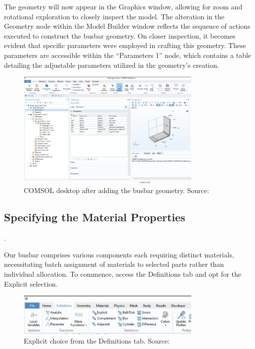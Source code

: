 The geometry will now appear in the Graphics window, allowing for zoom and rotational exploration to closely inspect the model. The alteration in the Geometry node within the Model Builder window reflects the sequence of actions executed to construct the busbar geometry. On closer inspection, it becomes evident that specific parameters were employed in crafting this geometry. These parameters are accessible within the ``Parameters 1'' node, which contains a table detailing the adjustable parameters utilized in the geometry's creation.

\begin{figure}[H]
  \centering
  \includegraphics[width=0.8\textwidth]{Chapters/Figures/Chapter 3 Figures/Initial Busbar Geom.png}
  \caption{COMSOL desktop after adding the busbar geometry. Source: \cite{multiphysics__modeling_nodate}}
  \label{fig:COMSOL desktop after busbar geometry}
\end{figure}

\subsection{Specifying the Material Properties}.

Our busbar comprises various components each requiring distinct materials, necessitating batch assignment of materials to selected parts rather than individual allocation. To commence, access the Definitions tab and opt for the Explicit selection.

\begin{figure}[H]
  \centering
  \includegraphics[width=0.8\textwidth]{Chapters/Figures/Chapter 3 Figures/Explicit Choice Selection from Definitions Tab.png}
  \caption{Explicit choice from the Definitions tab. Source: \cite{multiphysics__modeling_nodate}}
  \label{fig:Explicit choice from the Definitions tab.}
\end{figure}

